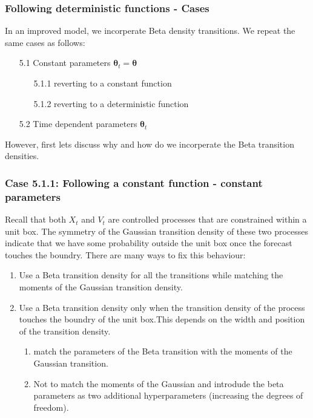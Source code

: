 \documentclass[aspectratio=169]{beamer}\usepackage[utf8]{inputenc}
\begin{document}
\begin{frame}\frametitle{Following deterministic functions - Cases }

In an improved model, we incorperate  Beta density transitions. We repeat the same cases as follows:
\begin{itemize}
\item[5.1] Constant parameters $\bm{\theta}_t = \bm{\theta} $
	\begin{itemize}
	\item[5.1.1] reverting to a constant function
	\item[5.1.2] reverting to a deterministic function
	\end{itemize}
\item[5.2] Time dependent parameters $\bm{\theta}_t$
\end{itemize}

However, first lets discuss why and how do we incorperate the Beta transition densities.

\end{frame}


\begin{frame}\frametitle{ Case 5.1.1: Following a constant function - constant parameters }
Recall that both $X_t$ and $V_t$ are controlled processes that are constrained within a unit box. The symmetry of the Gaussian transition density of these two processes indicate that we have some probability outside the unit box once the forecast touches the boundry. There are many ways to fix this behaviour:
\begin{enumerate}
\item Use a Beta transition density for all the transitions while matching the moments of the Gaussian transition density.
\item Use a Beta transition density only when the transition density of the process touches the boundry of the unit box.This depends on the width and position of the transition density.
\begin{enumerate}
\item match the parameters of the Beta transition with the moments of the Gaussian transition.
\item Not to match the moments of the Gaussian and introdude the beta parameters as two additional hyperparameters (increasing the degrees of freedom).
\end{enumerate}
\end{enumerate}

\end{frame}
\end{document}
